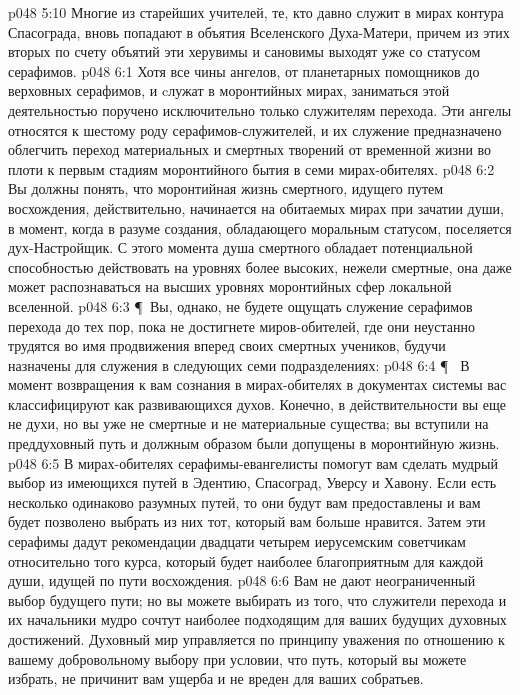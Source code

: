 \vs p048 5:10 Многие из старейших учителей, те, кто давно служит в мирах контура Спасограда, вновь попадают в объятия Вселенского Духа\hyp{}Матери, причем из этих вторых по счету объятий эти херувимы и сановимы выходят уже со статусом серафимов.
\vs p048 6:1 Хотя все чины ангелов, от планетарных помощников до верховных серафимов, и cлужат в моронтийных мирах, заниматься этой деятельностью поручено исключительно только служителям перехода. Эти ангелы относятся к шестому роду серафимов\hyp{}служителей, и их служение предназначено облегчить переход материальных и смертных творений от временной жизни во плоти к первым стадиям моронтийного бытия в семи мирах\hyp{}обителях.
\vs p048 6:2 Вы должны понять, что моронтийная жизнь смертного, идущего путем восхождения, действительно, начинается на обитаемых мирах при зачатии души, в момент, когда в разуме создания, обладающего моральным статусом, поселяется дух\hyp{}Настройщик. С этого момента душа смертного обладает потенциальной способностью действовать на уровнях более высоких, нежели смертные, она даже может распознаваться на высших уровнях моронтийных сфер локальной вселенной.
\vs p048 6:3 \P\ Вы, однако, не будете ощущать служение серафимов перехода до тех пор, пока не достигнете миров\hyp{}обителей, где они неустанно трудятся во имя продвижения вперед своих смертных учеников, будучи назначены для служения в следующих семи подразделениях:
\vs p048 6:4 \P\ \bibnobreakspace {} В момент возвращения к вам сознания в мирах\hyp{}обителях в документах системы вас классифицируют как развивающихся духов. Конечно, в действительности вы еще не духи, но вы уже не смертные и не материальные существа; вы вступили на преддуховный путь и должным образом были допущены в моронтийную жизнь.
\vs p048 6:5 В мирах\hyp{}обителях серафимы\hyp{}евангелисты помогут вам сделать мудрый выбор из имеющихся путей в Эдентию, Спасоград, Уверсу и Хавону. Если есть несколько одинаково разумных путей, то они будут вам предоставлены и вам будет позволено выбрать из них тот, который вам больше нравится. Затем эти серафимы дадут рекомендации двадцати четырем иерусемским советчикам относительно того курса, который будет наиболее благоприятным для каждой души, идущей по пути восхождения.
\vs p048 6:6 Вам не дают неограниченный выбор будущего пути; но вы можете выбирать из того, что служители перехода и их начальники мудро сочтут наиболее подходящим для ваших будущих духовных достижений. Духовный мир управляется по принципу уважения по отношению к вашему добровольному выбору при условии, что путь, который вы можете избрать, не причинит вам ущерба и не вреден для ваших собратьев.
